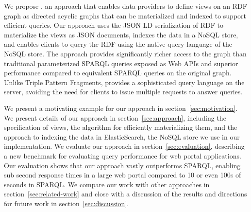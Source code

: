We propose \ldviews, an approach that enables data providers to define views on an RDF graph as directed acyclic graphs that can be materialized and indexed to support efficient queries.
Our approach uses the JSON-LD serialization of RDF \cite{Lanthaler:2012:UJC:2307819.2307827} to materialize the views as JSON documents, indexes the data in a NoSQL store, and enables clients to query the RDF using the native query language of the NoSQL store.
%
The approach provides significantly richer access to the graph than traditional parameterized SPARQL queries exposed as Web APIs and superior performance compared to equivalent SPARQL queries on the original graph.
Unlike Triple Pattern Fragments, \ldviews provides a sophisticated query language on the server, avoiding the need for clients to issue multiple requests to answer queries. 

We present a motivating example for our approach in section~\ref{sec:motivation}.
We present details of our approach in section~\ref{sec:approach}, including the specification of views, the algorithm for efficiently materializing them, and the approach to indexing the data in ElasticSearch, the NoSQL store we use in our implementation.
We evaluate our approach in section~\ref{sec:evaluation}, describing a new benchmark for evaluating query performance for web portal applications. 
Our evaluation shows that our approach vastly outperforms SPARQL, enabling sub second response times in a large web portal compared to 10 or even 100s of seconds in SPARQL.
We compare our work with other approaches in section~\ref{sec:related-work} and close with a discussion of the results and directions for future work in section~\ref{sec:discussion}.
